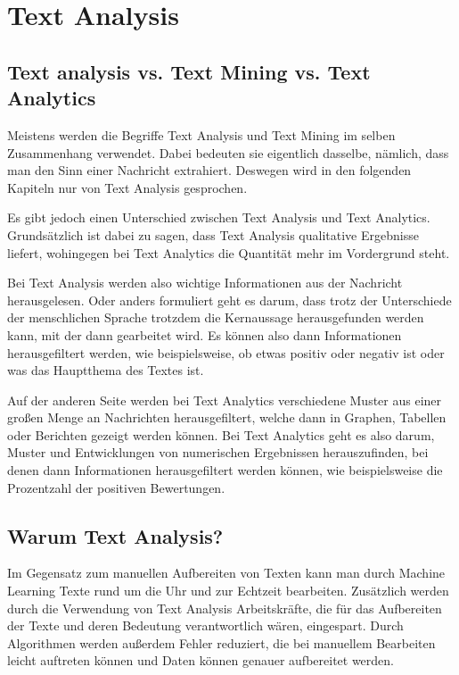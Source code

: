 \section{Text Analysis}\label{sec:text-analysis}

\subsection{Text analysis vs. Text Mining vs. Text Analytics}\label{subsec:text-analysis-vs-text-mining-vs-text-analytics}

Meistens werden die Begriffe Text Analysis und Text Mining im selben Zusammenhang verwendet.
Dabei bedeuten sie eigentlich dasselbe, nämlich, dass man den Sinn einer Nachricht extrahiert.
Deswegen wird in den folgenden Kapiteln nur von Text Analysis gesprochen.

Es gibt jedoch einen Unterschied zwischen Text Analysis und Text Analytics.
Grundsätzlich ist dabei zu sagen, dass Text Analysis qualitative Ergebnisse liefert, wohingegen bei Text Analytics die Quantität mehr im Vordergrund steht.\cite{textAnalysisMonkeylearn, machineLearningTextAnalysis}

Bei Text Analysis werden also wichtige Informationen aus der Nachricht herausgelesen.
Oder anders formuliert geht es darum, dass trotz der Unterschiede der menschlichen Sprache trotzdem die Kernaussage herausgefunden werden kann, mit der dann gearbeitet wird.
Es können also dann Informationen herausgefiltert werden, wie beispielsweise, ob etwas positiv oder negativ ist oder was das Hauptthema des Textes ist.\cite{textAnalysisMonkeylearn, machineLearningTextAnalysis}

Auf der anderen Seite werden bei Text Analytics verschiedene Muster aus einer großen Menge an Nachrichten herausgefiltert, welche dann in Graphen, Tabellen oder Berichten gezeigt werden können.
Bei Text Analytics geht es also darum, Muster und Entwicklungen von numerischen Ergebnissen herauszufinden, bei denen dann Informationen herausgefiltert werden können, wie beispielsweise die Prozentzahl der positiven Bewertungen.\cite{textAnalysisMonkeylearn, machineLearningTextAnalysis}

\subsection{Warum Text Analysis?}\label{subsec:why-text-analysis}

Im Gegensatz zum manuellen Aufbereiten von Texten kann man durch Machine Learning Texte rund um die Uhr und zur Echtzeit bearbeiten.
Zusätzlich werden durch die Verwendung von Text Analysis Arbeitskräfte, die für das Aufbereiten der Texte und deren Bedeutung verantwortlich wären, eingespart.
Durch Algorithmen werden außerdem Fehler reduziert, die bei manuellem Bearbeiten leicht auftreten können und Daten können genauer aufbereitet werden.\cite{textAnalysisMonkeylearn}


